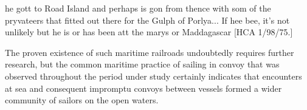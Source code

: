 \begin{styleStandard}
he gott to Road Island and perhaps is gon from thence with som of the pryvateers that fitted out there for the Gulph of Porlya... If hee bee, it’s not unlikely but he is or has been att the marys or Maddagascar [HCA 1/98/75.] 
\end{styleStandard}

\begin{styleStandard}
The proven existence of such maritime railroads undoubtedly requires further research, but the common maritime practice of sailing in convoy that was observed throughout the period under study certainly indicates that encounters at sea and consequent impromptu convoys between vessels formed a wider community of sailors on the open waters. 
\end{styleStandard}


